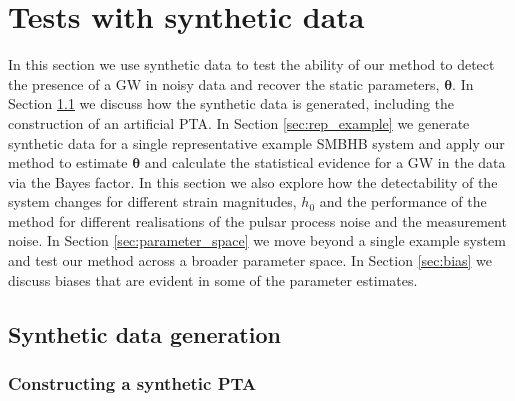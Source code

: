 \documentclass[fleqn,usenatbib,useAMS]{mnras}
\begin{document}
\section{Tests with synthetic data} \label{sec:testing}
In this section we use synthetic data to test the ability of our method to detect the presence of a GW in noisy data and recover the static parameters, $\boldsymbol{\theta}$. In Section \ref{sec:synth_data} we discuss how the synthetic data is generated, including the construction of an artificial PTA. In Section \ref{sec:rep_example} we generate synthetic data for a single representative example SMBHB system and apply our method to estimate $\boldsymbol{\theta}$ and calculate the statistical evidence for a GW in the data via the Bayes factor. In this section we also explore how the detectability of the system changes for different strain magnitudes, $h_0$ and the performance of the method for different realisations of the pulsar process noise and the measurement noise. In Section \ref{sec:parameter_space} we move beyond a single example system and test our method across a broader parameter space. In Section \ref{sec:bias} we discuss biases that are evident in some of the parameter estimates.

\subsection{Synthetic data generation} \label{sec:synth_data}

\subsubsection{Constructing a synthetic PTA}\label{sec:synt_pta}
\end{document}
